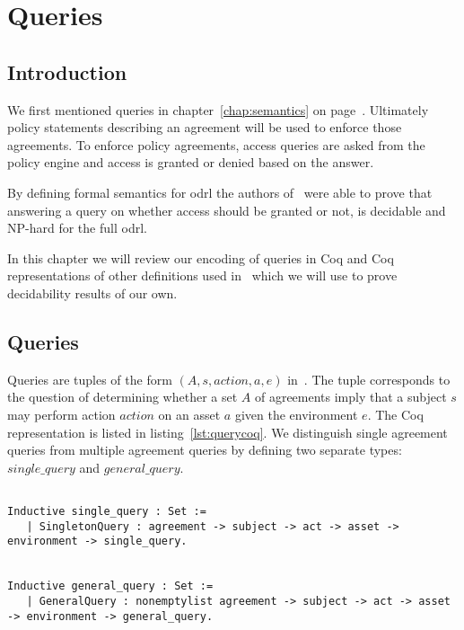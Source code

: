 \chapter{Queries}\label{chap:queries}


\section{Introduction}


We first mentioned queries in chapter~\ref{chap:semantics} on page~\pageref{chap:semantics}. Ultimately policy statements describing an agreement will be used to enforce those agreements. To enforce policy agreements, access queries are asked from the policy engine and access is granted or denied based on the answer.

By defining formal semantics for \ac{odrl} the authors of~\cite{pucella2006} were able to prove that answering a query on whether access should be granted or not, is decidable and NP-hard for the full \ac{odrl}. 

In this chapter we will review our encoding of queries in Coq and Coq representations of other definitions used in~\cite{pucella2006} which we will use to prove decidability results of our own. 


\section{Queries}

Queries are tuples of the form $(A, s, action, a, e)$ in~\cite{pucella2006}. The tuple corresponds to the question of determining whether a set $A$ of agreements imply that a subject $s$ may perform action $action$ on an asset $a$ given the environment $e$. The Coq representation is listed in listing~\ref{lst:querycoq}. We distinguish single agreement queries from multiple agreement queries by defining two separate types: $single\_query$ and $general\_query$.

\begin{minipage}[c]{0.95\textwidth}
\begin{lstlisting}

Inductive single_query : Set := 
   | SingletonQuery : agreement -> subject -> act -> asset -> environment -> single_query.
   

Inductive general_query : Set := 
   | GeneralQuery : nonemptylist agreement -> subject -> act -> asset -> environment -> general_query.
\end{lstlisting}
\end{minipage}

